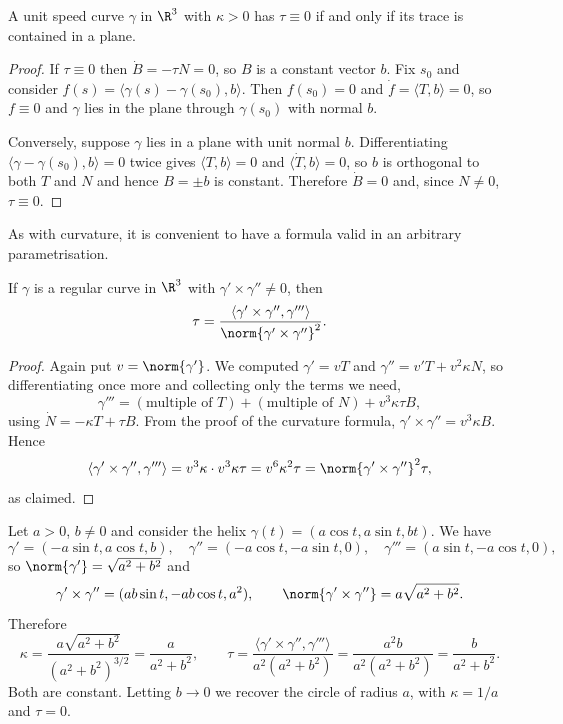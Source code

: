 \begin{proposition}
    A unit speed curve $\gamma$ in $\R^3$ with $\kappa > 0$ has $\tau \equiv 0$ if and only if its trace is contained in a plane.
\end{proposition}
\begin{proof}
    If $\tau \equiv 0$ then $\dot B = -\tau N = 0$, so $B$ is a constant vector $b$. Fix $s_0$ and consider $f(s) = \langle \gamma(s) - \gamma(s_0), b\rangle$. Then $f(s_0) = 0$ and $\dot f = \langle T, b \rangle = 0$, so $f \equiv 0$ and $\gamma$ lies in the plane through $\gamma(s_0)$ with normal $b$.

    Conversely, suppose $\gamma$ lies in a plane with unit normal $b$. Differentiating $\langle \gamma - \gamma(s_0), b \rangle = 0$ twice gives $\langle T, b \rangle = 0$ and $\langle \dot T, b\rangle = 0$, so $b$ is orthogonal to both $T$ and $N$ and hence $B = \pm b$ is constant. Therefore $\dot B = 0$ and, since $N \neq 0$, $\tau \equiv 0$.
\end{proof}

As with curvature, it is convenient to have a formula valid in an arbitrary parametrisation.

\begin{proposition}
    If $\gamma$ is a regular curve in $\R^3$ with $\gamma' \times \gamma'' \neq 0$, then
    $$
    \tau = \frac{\langle \gamma' \times \gamma'', \gamma'''\rangle}{\norm{\gamma' \times \gamma''}^2}.
    $$
\end{proposition}
\begin{proof}
    Again put $v = \norm{\gamma'}$. We computed $\gamma' = vT$ and $\gamma'' = v'T + v^2\kappa N$, so differentiating once more and collecting only the terms we need,
    $$
    \gamma''' = (\text{multiple of } T) + (\text{multiple of } N) + v^3 \kappa\tau B,
    $$
    using $\dot N = -\kappa T + \tau B$. From the proof of the curvature formula, $\gamma' \times \gamma'' = v^3\kappa B$. Hence
    $$
    \langle \gamma' \times \gamma'', \gamma'''\rangle = v^3\kappa \cdot v^3 \kappa \tau = v^6\kappa^2\tau = \norm{\gamma'\times\gamma''}^2 \tau,
    $$
    as claimed.
\end{proof}

\begin{example}
    Let $a > 0$, $b \neq 0$ and consider the helix $\gamma(t) = (a\cos t, a \sin t, bt)$. We have
    $$
    \gamma' = (-a \sin t, a\cos t, b), \quad \gamma'' = (-a\cos t, -a \sin t, 0), \quad \gamma''' = (a \sin t, -a\cos t, 0),
    $$
    so $\norm{\gamma'} = \sqrt{a^2+b^2}$ and
    $$
    \gamma'\times \gamma'' = (ab\sin t, -ab\cos t, a^2), \qquad \norm{\gamma' \times \gamma''} = a\sqrt{a^2+b^2}.
    $$
    Therefore
    $$
    \kappa = \frac{a\sqrt{a^2+b^2}}{(a^2+b^2)^{3/2}} = \frac{a}{a^2+b^2}, \qquad \tau = \frac{\langle \gamma'\times\gamma'', \gamma'''\rangle}{a^2(a^2+b^2)} = \frac{a^2 b}{a^2(a^2+b^2)} = \frac{b}{a^2+b^2}.
    $$
    Both are constant. Letting $b \to 0$ we recover the circle of radius $a$, with $\kappa = 1/a$ and $\tau = 0$.
\end{example}

